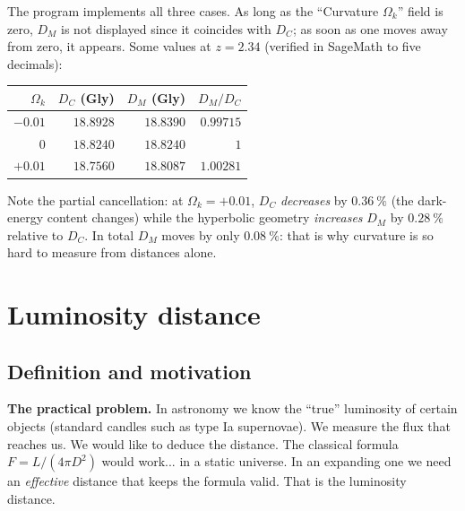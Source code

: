 \documentclass[11pt,a4paper,openany]{report}
\newcommand{\Ok}{\Omega_{k}}
\begin{document}
\begin{tcolorbox}[gui]
The program implements all three cases. As long as the “Curvature $\Ok$”
field is zero, $D_{M}$ is not displayed since it coincides with $D_{C}$; as
soon as one moves away from zero, it appears. Some values at $z = 2.34$
(verified in SageMath to five decimals):

\medskip
\begin{center}
\begin{tabular}{rrrr}
\toprule
$\Ok$ & $D_{C}$ (Gly) & $D_{M}$ (Gly) & $D_{M}/D_{C}$ \\
\midrule
$-0.01$ & $18.8928$ & $18.8390$ & $0.99715$ \\
$0$       & $18.8240$ & $18.8240$ & $1$ \\
$+0.01$ & $18.7560$ & $18.8087$ & $1.00281$ \\
\bottomrule
\end{tabular}
\end{center}

\medskip
Note the partial cancellation: at $\Ok = +0.01$, $D_{C}$ \emph{decreases} by
$0.36~\%$ (the dark-energy content changes) while the hyperbolic geometry
\emph{increases} $D_M$ by $0.28~\%$ relative to $D_C$. In total $D_{M}$ moves by
only $0.08~\%$: that is why curvature is so hard to measure from distances
alone.
\end{tcolorbox}

\chapter{Luminosity distance}
\label{chap:DL}

\section{Definition and motivation}

\begin{tcolorbox}[plain]
\textbf{The practical problem.} In astronomy we know the “true” luminosity of
certain objects (standard candles such as type Ia supernovae). We measure the
flux that reaches us. We would like to deduce the distance. The classical
formula $F = L/(4\pi D^{2})$ would work... in a static universe. In an
expanding one we need an \emph{effective} distance that keeps the formula
valid. That is the luminosity distance.
\end{tcolorbox}
\end{document}
